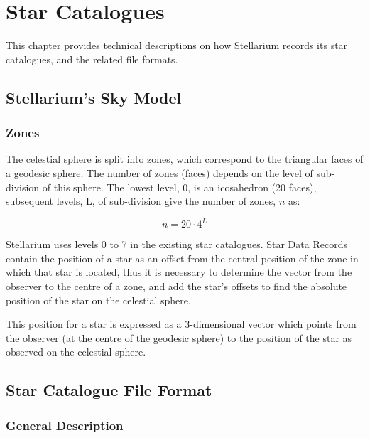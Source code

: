 
\chapter{Star Catalogues}
\label{ch:Catalogues}

This chapter provides technical descriptions on how Stellarium records its star catalogues, and
the related file formats.

\section{Stellarium's Sky Model}
\label{sec:Catalogues:SkyModel}

\subsection{Zones}
\label{sec:Catalogues:SkyModel:Zones}

The celestial sphere is split into zones, which correspond to the
triangular faces of a geodesic sphere. The number of zones (faces)
depends on the level of sub-division of this sphere. The lowest level,
0, is an icosahedron (20 faces), subsequent levels, L, of sub-division
give the number of zones, $n$ as:

\begin{equation}
n=20 \cdot 4^L
\end{equation}

Stellarium uses levels 0 to 7 in the existing star catalogues. Star Data
Records contain the position of a star as an offset from the central
position of the zone in which that star is located, thus it is necessary
to determine the vector from the observer to the centre of a zone, and
add the star's offsets to find the absolute position of the star on the
celestial sphere.

This position for a star is expressed as a 3-dimensional vector which
points from the observer (at the centre of the geodesic sphere) to the
position of the star as observed on the celestial sphere.

\section{Star Catalogue File Format}\label{star-catalogue-file-format}

\subsection{General Description}\label{general-description}


